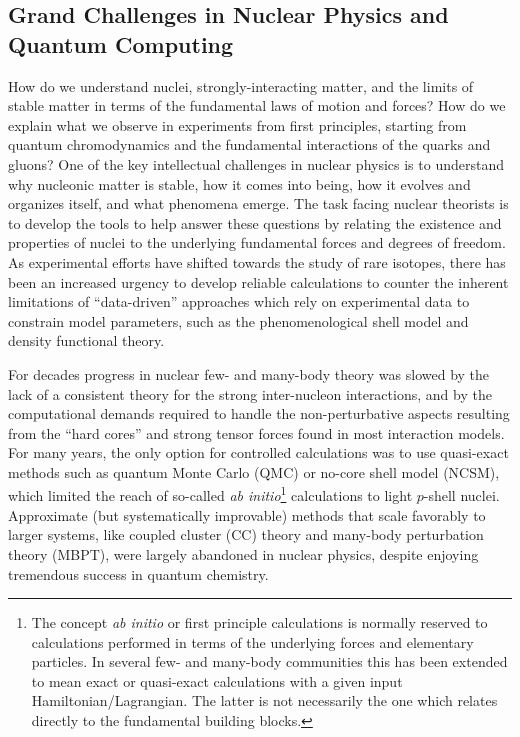 \documentclass[11pt]{article}
\begin{document}
\subsection{Grand Challenges in Nuclear Physics and Quantum Computing}

How do we understand nuclei, strongly-interacting matter, and the limits of
stable matter in terms of the fundamental laws of motion and
forces?  How do we explain what we observe in experiments from first principles,
starting from quantum chromodynamics and the fundamental interactions of the quarks and gluons?  One of the key intellectual challenges in nuclear physics is to understand
why nucleonic matter is stable, how it comes into being, how it
evolves and organizes itself, and what phenomena emerge. The task
facing nuclear theorists is to develop the tools to help answer these
questions by relating the existence and properties of nuclei to the
underlying fundamental forces and degrees of freedom. As experimental
efforts have shifted towards the study of rare
isotopes, there
has been an increased urgency to develop reliable 
calculations to counter the inherent limitations of ``data-driven''
approaches which rely on experimental data to constrain model
parameters, such as the phenomenological shell model and density
functional theory. 

For decades progress in nuclear few- and many-body theory was slowed
by the lack of a consistent theory for the strong inter-nucleon
interactions, and by the computational demands required to handle the
non-perturbative aspects resulting from the ``hard cores'' and strong
tensor forces found in most interaction models.  For many years, the
only option for controlled calculations was to use quasi-exact methods
such as quantum Monte Carlo (QMC) or no-core shell model (NCSM), which
limited the reach of so-called \emph{ab initio}\footnote{The concept
  \emph{ab initio} or first principle calculations is normally
  reserved to calculations performed in terms of the underlying forces
  and elementary particles. In several few- and many-body communities
  this has been extended to mean exact or quasi-exact calculations
  with a given input Hamiltonian/Lagrangian. The latter is not
  necessarily the one which relates directly to the fundamental
  building blocks.} calculations to light $p$-shell nuclei. Approximate
(but systematically improvable) methods that scale favorably to larger
systems, like coupled cluster (CC) theory and many-body perturbation
theory (MBPT), were largely abandoned in nuclear physics, despite
enjoying tremendous success in quantum chemistry.
\end{document}
